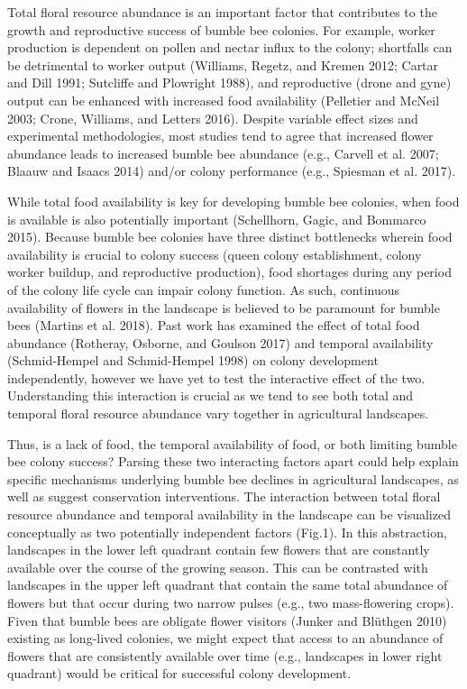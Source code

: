\documentclass[11pt,]{article}
\begin{document}
Total floral resource abundance is an important factor that contributes
to the growth and reproductive success of bumble bee colonies. For
example, worker production is dependent on pollen and nectar influx to
the colony; shortfalls can be detrimental to worker output (Williams,
Regetz, and Kremen 2012; Cartar and Dill 1991; Sutcliffe and Plowright
1988), and reproductive (drone and gyne) output can be enhanced with
increased food availability (Pelletier and McNeil 2003; Crone, Williams,
and Letters 2016). Despite variable effect sizes and experimental
methodologies, most studies tend to agree that increased flower
abundance leads to increased bumble bee abundance (e.g., Carvell et al.
2007; Blaauw and Isaacs 2014) and/or colony performance (e.g., Spiesman
et al. 2017).

While total food availability is key for developing bumble bee colonies,
when food is available is also potentially important (Schellhorn, Gagic,
and Bommarco 2015). Because bumble bee colonies have three distinct
bottlenecks wherein food availability is crucial to colony success
(queen colony establishment, colony worker buildup, and reproductive
production), food shortages during any period of the colony life cycle
can impair colony function. As such, continuous availability of flowers
in the landscape is believed to be paramount for bumble bees (Martins et
al. 2018). Past work has examined the effect of total food abundance
(Rotheray, Osborne, and Goulson 2017) and temporal availability
(Schmid-Hempel and Schmid-Hempel 1998) on colony development
independently, however we have yet to test the interactive effect of the
two. Understanding this interaction is crucial as we tend to see both
total and temporal floral resource abundance vary together in
agricultural landscapes.

Thus, is a lack of food, the temporal availability of food, or both
limiting bumble bee colony success? Parsing these two interacting
factors apart could help explain specific mechanisms underlying bumble
bee declines in agricultural landscapes, as well as suggest conservation
interventions. The interaction between total floral resource abundance
and temporal availability in the landscape can be visualized
conceptually as two potentially independent factors (Fig.1). In this
abstraction, landscapes in the lower left quadrant contain few flowers
that are constantly available over the course of the growing season.
This can be contrasted with landscapes in the upper left quadrant that
contain the same total abundance of flowers but that occur during two
narrow pulses (e.g., two mass-flowering crops). Fiven that bumble bees
are obligate flower visitors (Junker and Blüthgen 2010) existing as
long-lived colonies, we might expect that access to an abundance of
flowers that are consistently available over time (e.g., landscapes in
lower right quadrant) would be critical for successful colony
development.
\end{document}
